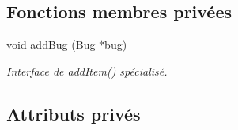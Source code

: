 \subsection*{Fonctions membres privées}
\begin{DoxyCompactItemize}
\item 
void \hyperlink{classRender_a4a1fed13f76997e45e90dd39d622d33e}{addBug} (\hyperlink{classBug}{Bug} $\ast$bug)
\begin{DoxyCompactList}\small\item\em Interface de addItem() spécialisé. \end{DoxyCompactList}\end{DoxyCompactItemize}
\subsection*{Attributs privés}
